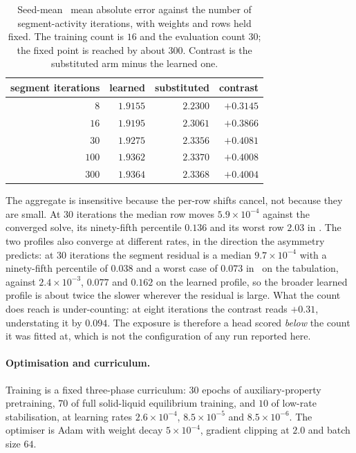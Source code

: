 \begin{table}[t]
\centering
{\footnotesize
\begin{tabular}{@{}rrrr@{}}
\toprule
segment iterations & learned & substituted & contrast \\
\midrule
$8$   & $1.9155$ & $2.2300$ & $+0.3145$ \\
$16$  & $1.9195$ & $2.3061$ & $+0.3866$ \\
$30$  & $1.9275$ & $2.3356$ & $+0.4081$ \\
$100$ & $1.9362$ & $2.3370$ & $+0.4008$ \\
$300$ & $1.9364$ & $2.3368$ & $+0.4004$ \\
\bottomrule
\end{tabular}}
\caption{Seed-mean \lnx\ mean absolute error against the number of segment-activity iterations,
with weights and rows held fixed. The training count is $16$ and the evaluation count $30$; the
fixed point is reached by about $300$. Contrast is the substituted arm minus the learned one.}
\label{tab:si-iter}
\end{table}

The aggregate is insensitive because the per-row shifts cancel, not because they are small. At $30$
iterations the median row moves $5.9\times10^{-4}$ against the converged solve, its ninety-fifth
percentile $0.136$ and its worst row $2.03$ in \lnx. The two profiles also converge at different
rates, in the direction the asymmetry predicts: at $30$ iterations the segment residual is a median
$9.7\times10^{-4}$ with a ninety-fifth percentile of $0.038$ and a worst case of $0.073$ in \lngi\
on the tabulation, against $2.4\times10^{-3}$, $0.077$ and $0.162$ on the learned profile, so the
broader learned profile is about twice the slower wherever the residual is large. What the count
does reach is under-counting: at eight iterations the contrast reads $+0.31$, understating it by
$0.094$. The exposure is therefore a head scored \emph{below} the count it was fitted at, which is
not the configuration of any run reported here.

\paragraph{Optimisation and curriculum.}
Training is a fixed three-phase curriculum: $30$ epochs of auxiliary-property pretraining, $70$ of
full solid-liquid equilibrium training, and $10$ of low-rate stabilisation, at learning rates
$2.6\times10^{-4}$, $8.5\times10^{-5}$ and $8.5\times10^{-6}$. The optimiser is Adam with weight
decay $5\times10^{-4}$, gradient clipping at $2.0$ and batch size $64$.

